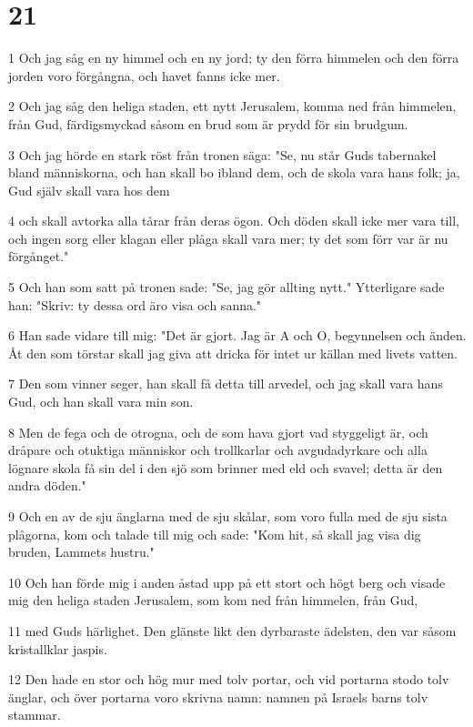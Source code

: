 \chapter{21}

\par 1 Och jag såg en ny himmel och en ny jord; ty den förra himmelen och den förra jorden voro förgångna, och havet fanns icke mer.
\par 2 Och jag såg den heliga staden, ett nytt Jerusalem, komma ned från himmelen, från Gud, färdigsmyckad såsom en brud som är prydd för sin brudgum.
\par 3 Och jag hörde en stark röst från tronen säga: "Se, nu står Guds tabernakel bland människorna, och han skall bo ibland dem, och de skola vara hans folk; ja, Gud själv skall vara hos dem
\par 4 och skall avtorka alla tårar från deras ögon. Och döden skall icke mer vara till, och ingen sorg eller klagan eller plåga skall vara mer; ty det som förr var är nu förgånget."
\par 5 Och han som satt på tronen sade: "Se, jag gör allting nytt." Ytterligare sade han: "Skriv: ty dessa ord äro visa och sanna."
\par 6 Han sade vidare till mig: "Det är gjort. Jag är A och O, begynnelsen och änden. Åt den som törstar skall jag giva att dricka för intet ur källan med livets vatten.
\par 7 Den som vinner seger, han skall få detta till arvedel, och jag skall vara hans Gud, och han skall vara min son.
\par 8 Men de fega och de otrogna, och de som hava gjort vad styggeligt är, och dråpare och otuktiga människor och trollkarlar och avgudadyrkare och alla lögnare skola få sin del i den sjö som brinner med eld och svavel; detta är den andra döden."
\par 9 Och en av de sju änglarna med de sju skålar, som voro fulla med de sju sista plågorna, kom och talade till mig och sade: "Kom hit, så skall jag visa dig bruden, Lammets hustru."
\par 10 Och han förde mig i anden åstad upp på ett stort och högt berg och visade mig den heliga staden Jerusalem, som kom ned från himmelen, från Gud,
\par 11 med Guds härlighet. Den glänste likt den dyrbaraste ädelsten, den var såsom kristallklar jaspis.
\par 12 Den hade en stor och hög mur med tolv portar, och vid portarna stodo tolv änglar, och över portarna voro skrivna namn: namnen på Israels barns tolv stammar.
